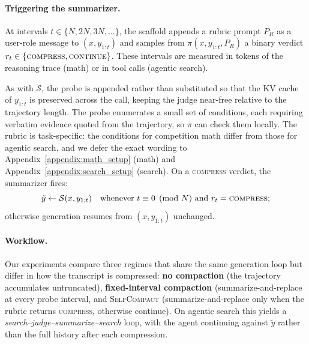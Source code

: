 \documentclass{article}
\newcommand{\method}{\textsc{{SelfCompact}}}
\begin{document}
\paragraph{Triggering the summarizer.} At intervals
$t \in \{N, 2N, 3N, \ldots\}$, the scaffold appends a rubric prompt $P_R$ as a user-role message to
$(x, y_{1:t})$ and samples from $\pi(x, y_{1:t},P_R)$ a binary verdict $r_t \in
\{\textsc{compress}, \textsc{continue}\}$. These intervals are measured in tokens of the reasoning trace (math) or in tool calls (agentic search).

As with $\mathcal{S}$, the probe is
appended rather than substituted so that the KV cache of $y_{1:t}$ is
preserved across the call, keeping the judge near-free relative to the
trajectory length. The probe enumerates a small set of conditions, each
requiring verbatim evidence quoted from the trajectory, so $\pi$ can check
them locally. The rubric is task-specific: the conditions for competition
math differ from those for agentic search, and we defer the exact wording to
Appendix~\ref{appendix:math_setup} (math) and
Appendix~\ref{appendix:search_setup} (search). On a \textsc{compress} verdict,
the summarizer fires:
\[
\tilde{y} \leftarrow \mathcal{S}(x, y_{1:t}) \quad \text{whenever } t \equiv 0 \pmod{N} \text{ and } r_t = \textsc{compress};
\]
otherwise generation resumes from $(x, y_{1:t})$ unchanged.

\paragraph{Workflow.} Our experiments compare three regimes that share the same generation loop but differ in how the transcript is compressed: \textbf{no compaction} (the trajectory accumulates untruncated), \textbf{fixed-interval compaction} (summarize-and-replace at every probe interval, and \method{} (summarize-and-replace only when the rubric returns \textsc{compress}, otherwise continue). On agentic search this yields a \emph{search--judge--summarize--search} loop, with the agent continuing against $\tilde{y}$ rather than the full history after each compression. 
\end{document}
